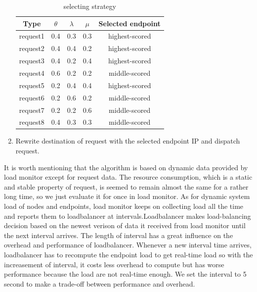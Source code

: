 \begin{enumerate}
       \hspace{0pt}
       \begin{table}[htbp]
        \begin{center}
         \begin{tabular}{c|c|c|c|c}
          \hline
          Type     & $\theta$ & $\lambda$ & $\mu$ & Selected endpoint \\ \hline
          request1 & 0.4      & 0.3       & 0.3   & highest-scored    \\ \hline
          request2 & 0.4      & 0.4       & 0.2   & highest-scored    \\ \hline
          request3 & 0.4      & 0.2       & 0.4   & highest-scored    \\ \hline
          request4 & 0.6      & 0.2       & 0.2   & middle-scored     \\ \hline
          request5 & 0.2      & 0.4       & 0.4   & highest-scored    \\ \hline
          request6 & 0.2      & 0.6       & 0.2   & middle-scored     \\ \hline
          request7 & 0.2      & 0.2       & 0.6   & middle-scored     \\ \hline
          request8 & 0.4      & 0.3       & 0.3   & middle-scored     \\ \hline
         \end{tabular}
        \end{center}
        \caption{selecting strategy}
        \label{table:selecting_strategy}
       \end{table}
 \item Rewrite destination of request with the selected endpoint IP and dispatch request.
\end{enumerate}

It is worth mentioning that the algorithm is based on dynamic data provided by load monitor except for
request data. The resource consumption, which is a static and stable property of request, is seemed to remain almost the same for a rather long time,
so we just evaluate it for once in load monitor. As for dynamic system load of nodes and endpoints, load monitor keeps on collecting load all the time and
reports them to loadbalancer at intervals.Loadbalancer makes load-balancing decision based on the newest verison of data it received from load monitor until
the next interval arrives. The length of interval has a great influence on the overhead and performance of loadbalancer. Whenever a new interval time arrives,
loadbalancer has to recompute the endpoint load to get real-time load so with the increasement of interval, it costs less overhead to compute but has worse
performance because the load are not real-time enough. We set the interval to 5 second to make a trade-off between performance and overhead.
